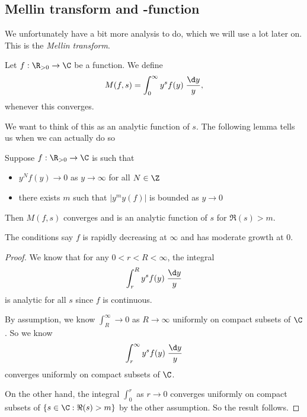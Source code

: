 \documentclass[a4paper]{article}
\begin{document}
\subsection{Mellin transform and -function}
We unfortunately have a bit more analysis to do, which we will use a lot later on. This is the \emph{Mellin transform}.

\begin{defi}
  Let $f: \R_{>0} \to\C$ be a function. We define
  \[
    M(f, s) = \int_0^\infty y^s f(y) \;\frac{\d y}{y},
  \]
  whenever this converges.
\end{defi}
We want to think of this as an analytic function of $s$. The following lemma tells us when we can actually do so
\begin{lemma}
  Suppose $f: \R_{>0} \to \C$ is such that
  \begin{itemize}
    \item $y^N f(y) \to 0$ as $y \to \infty$ for all $N \in \Z$
    \item there exists $m$ such that $|y^m y(f)|$ is bounded as $y \to 0$ 
  \end{itemize}
  Then $M(f, s)$ converges and is an analytic function of $s$ for $\Re(s) > m$.
\end{lemma}
The conditions say $f$ is rapidly decreasing at $\infty$ and has moderate growth at $0$.

\begin{proof}
  We know that for any $0 < r < R < \infty$, the integral
  \[
    \int_r^R y^s f(y) \;\frac{\d y}{y}
  \]
  is analytic for all $s$ since $f$ is continuous.

  By assumption, we know $\int_R^\infty \to 0$ as $R \to \infty$ uniformly on compact subsets of $\C$. So we know
  \[
    \int_r^\infty y^s f(y) \;\frac{\d y}{y}
  \]
  converges uniformly on compact subsets of $\C$.

  On the other hand, the integral $\int_0^r$ as $r \to 0$ converges uniformly on compact subsets of $\{s \in \C: \Re(s) > m\}$ by the other assumption. So the result follows.
\end{proof}
\end{document}
